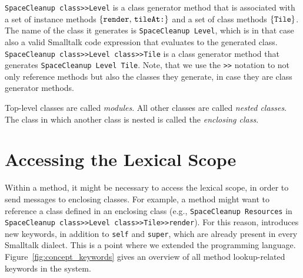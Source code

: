 \texttt{SpaceCleanup class>>Level} is a class generator method that is associated with a set of instance methods $\{\mbox{\texttt{render}, \texttt{tileAt:}}\}$ and a set of class methods $\{\mbox{\texttt{Tile}}\}$. The name of the class it generates is \texttt{SpaceCleanup Level}, which is in that case also a valid Smalltalk code expression that evaluates to the generated class. \texttt{SpaceCleanup class>>Level class>>Tile} is a class generator method that generates \texttt{SpaceCleanup Level Tile}. Note, that we use the \texttt{>>} notation to not only reference methods but also the classes they generate, in case they are class generator methods.

Top-level classes are called \emph{modules}. All other classes are called \emph{nested classes}. The class in which another class is nested is called the \emph{enclosing class}.


\section{Accessing the Lexical Scope}
Within a method, it might be necessary to access the lexical scope, in order to send messages to enclosing classes. For example, a method might want to reference a class defined in an enclosing class (e.g., \texttt{SpaceCleanup Resources} in \texttt{SpaceCleanup class>>Level class>>Tile>>render}). For this reason, \msname introduces new keywords, in addition to \texttt{self} and \texttt{super}, which are already present in every Smalltalk dialect. This is a point where we extended the programming language. Figure~\ref{fig:concept_keywords} gives an overview of all method lookup-related keywords in the system.

